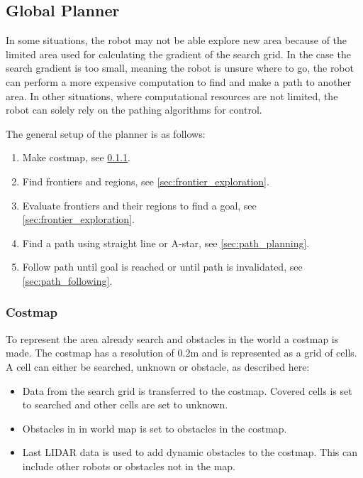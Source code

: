 
\subsection{Global Planner}
In some situations, the robot may not be able explore new area because of the limited area used for calculating the gradient of the search grid.
In the case the search gradient is too small, meaning the robot is unsure where to go, the robot can perform a more expensive computation to find and make a path to another area.
In other situations, where computational resources are not limited, the robot can solely rely on the pathing algorithms for control.

The general setup of the planner is as follows:
\begin{enumerate}
  \item Make costmap, see \cref{sec:costmap}.
  \item Find frontiers and regions, see \cref{sec:frontier_exploration}.
  \item Evaluate frontiers and their regions to find a goal, see \cref{sec:frontier_exploration}.
  \item Find a path using straight line or A-star, see \cref{sec:path_planning}.
  \item Follow path until goal is reached or until path is invalidated, see \cref{sec:path_following}.
\end{enumerate}

\subsubsection{Costmap}\label{sec:costmap}
To represent the area already search and obstacles in the world a costmap is made. 
The costmap has a resolution of $0.2$m and is represented as a grid of cells. A cell can either be searched, unknown or obstacle, as described here:
\begin{itemize}
  \item Data from the search grid is transferred to the costmap. Covered cells is set to searched and other cells are set to unknown.
  \item Obstacles in in world map is set to obstacles in the costmap.
  \item Last LIDAR data is used to add dynamic obstacles to the costmap. This can include other robots or obstacles not in the map.
\end{itemize}

